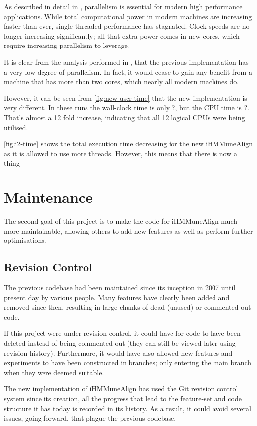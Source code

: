 As described in detail in , parallelism is essential for modern high performance applications. While total computational power in modern machines are increasing faster than ever, single threaded performance has stagnated. Clock speeds are no longer increasing significantly; all that extra power comes in new cores, which require increasing parallelism to leverage. 

It is clear from the analysis performed in , that the previous implementation has a very low degree of parallelism. In fact, it would cease to gain any benefit from a machine that has more than two cores, which nearly all modern machines do. 

However, it can be seen from \autoref{fig:new-user-time} that the new implementation is very different. In these runs the wall-clock time is only ?, but the CPU time is ?. That's almost a 12 fold increase, indicating that all 12 logical CPUs were being utilised. 

\autoref{fig:i2-time} shows the total execution time decreasing for the new iHMMuneAlign as it is allowed to use more threads. However, this means that there is now a thing 


\leavevmode
\section{Maintenance}
The second goal of this project is to make the code for iHMMuneAlign much more maintainable, allowing others to add new features as well as perform further optimisations.


\subsection{Revision Control}
The previous codebase had been maintained since its inception in 2007 until present day by various people. Many features have clearly been added and removed since then, resulting in large chunks of dead (unused) or commented out code.

If this project were under revision control, it could have for code to have been deleted instead of being commented out (they can still be viewed later using revision history). Furthermore, it would have also allowed new features and experiments to have been constructed in branches; only entering the main branch when they were deemed suitable.

The new implementation of iHMMuneAlign has used the Git revision control system since its creation, all the progress that lead to the feature-set and code structure it has today is recorded in its history. As a result, it could avoid several issues, going forward, that plague the previous codebase.

